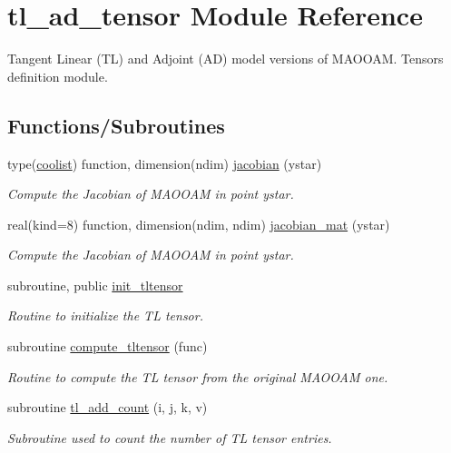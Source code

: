 \hypertarget{namespacetl__ad__tensor}{}\section{tl\+\_\+ad\+\_\+tensor Module Reference}
\label{namespacetl__ad__tensor}


Tangent Linear (TL) and Adjoint (AD) model versions of M\+A\+O\+O\+AM. Tensors definition module.  


\subsection*{Functions/\+Subroutines}
\begin{DoxyCompactItemize}
\item 
type(\hyperlink{structtensor_1_1coolist}{coolist}) function, dimension(ndim) \hyperlink{namespacetl__ad__tensor_af4dbec99377125d7df10d89524ba91b2}{jacobian} (ystar)
\begin{DoxyCompactList}\small\item\em Compute the Jacobian of M\+A\+O\+O\+AM in point ystar. \end{DoxyCompactList}\item 
real(kind=8) function, dimension(ndim, ndim) \hyperlink{namespacetl__ad__tensor_a19ab832f709efc3719eb272313462971}{jacobian\+\_\+mat} (ystar)
\begin{DoxyCompactList}\small\item\em Compute the Jacobian of M\+A\+O\+O\+AM in point ystar. \end{DoxyCompactList}\item 
subroutine, public \hyperlink{namespacetl__ad__tensor_a8a94fe84e907fc8835f798eddcff38e8}{init\+\_\+tltensor}
\begin{DoxyCompactList}\small\item\em Routine to initialize the TL tensor. \end{DoxyCompactList}\item 
subroutine \hyperlink{namespacetl__ad__tensor_a8b1027b49025fbeacd8fbd5d2127bebc}{compute\+\_\+tltensor} (func)
\begin{DoxyCompactList}\small\item\em Routine to compute the TL tensor from the original M\+A\+O\+O\+AM one. \end{DoxyCompactList}\item 
subroutine \hyperlink{namespacetl__ad__tensor_a3d69845cace6faef04342c297b0c2a09}{tl\+\_\+add\+\_\+count} (i, j, k, v)
\begin{DoxyCompactList}\small\item\em Subroutine used to count the number of TL tensor entries. \end{DoxyCompactList}\item 

\end{DoxyCompactItemize}
